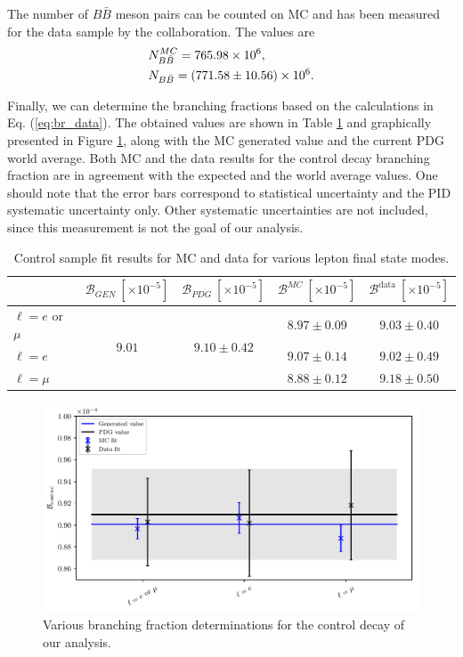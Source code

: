 The number of $B\bar B$ meson pairs can be counted on MC and has been measured for the data sample by the collaboration. The values are
\begin{align*}
&N_{B\bar B}^{MC} = 765.98\times 10^{6},\\
&N_{B\bar B} = (771.58 \pm 10.56)\times 10^{6}.
\end{align*}

Finally, we can determine the branching fractions based on the calculations in Eq. (\ref{eq:br_data}). The obtained values are shown in Table \ref{tab:br_result} and graphically presented in Figure \ref{fig:br_plot}, along with the MC generated value and the current PDG world average. Both MC and the data results for the control decay branching fraction are in agreement with the expected and the world average values. One should note that the error bars correspond to statistical uncertainty and the PID systematic uncertainty only. Other systematic uncertainties are not included, since this measurement is not the goal of our analysis.

\begin{table}[H]
	\centering
	\begin{tabular}{l|c|c|c|c}
		& $\mathcal{B}_{GEN}~[\times 10^{-5}]$ & $\mathcal{B}_{PDG}~[\times 10^{-5}]$ & $\mathcal{B}^{MC}~[\times 10^{-5}]$ & $\mathcal{B}^{\mathrm{data}}~[\times 10^{-5}]$ \\
		\toprule
		$\ell = e$ or $\mu$ & \multirow{3}{*}{$9.01$} & \multirow{3}{*}{$9.10\pm0.42$} & $8.97\pm0.09$ & $9.03\pm0.40$\\
		$\ell = e$ & & & $9.07\pm0.14$ & $9.02\pm0.49$ \\
		$\ell = \mu$  & & & $8.88\pm0.12$ & $9.18\pm0.50$\\
		\bottomrule
	\end{tabular}
	\captionsetup{width=.8\linewidth}
	\caption{Control sample fit results for MC and data for various lepton final state modes.}
	\label{tab:br_result}
\end{table}

\begin{figure}[H]
	\centering
	\captionsetup{width=0.8\linewidth}
	\includegraphics[width=\linewidth]{fig/br_plot}
	\caption{Various branching fraction determinations for the control decay of our analysis.}
	\label{fig:br_plot}
\end{figure}


